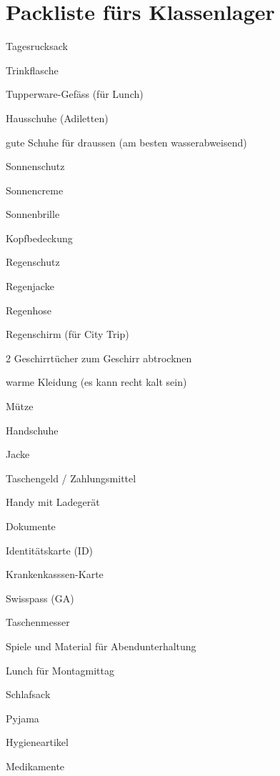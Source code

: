 

\section*{Packliste fürs Klassenlager}
\begin{todolist}
  \item Tagesrucksack
  \item Trinkflasche
  \item Tupperware-Gefäss (für Lunch)
  \item Hausschuhe (Adiletten)
  \item gute Schuhe für draussen (am besten wasserabweisend)
  \item Sonnenschutz
  \begin{todolist}
    \item Sonnencreme
    \item Sonnenbrille
    \item Kopfbedeckung
  \end{todolist}
  \item Regenschutz
  \begin{todolist}
    \item Regenjacke
    \item Regenhose
    \item Regenschirm (für City Trip)
  \end{todolist}
  \item 2 Geschirrtücher zum Geschirr abtrocknen
  \item warme Kleidung (es kann recht kalt sein)
  \begin{todolist}
    \item Mütze
    \item Handschuhe
    \item Jacke
  \end{todolist}
  \item Taschengeld / Zahlungsmittel
  \item Handy mit Ladegerät
  \item Dokumente
  \begin{todolist}
    \item Identitätskarte (ID)
    \item Krankenkasssen-Karte
    \item Swisspass (GA)
  \end{todolist}
  \item Taschenmesser
  \item Spiele und Material für Abendunterhaltung
  \item Lunch für Montagmittag
  \item Schlafsack
  \item Pyjama
  \item Hygieneartikel
  \item Medikamente
\end{todolist}

